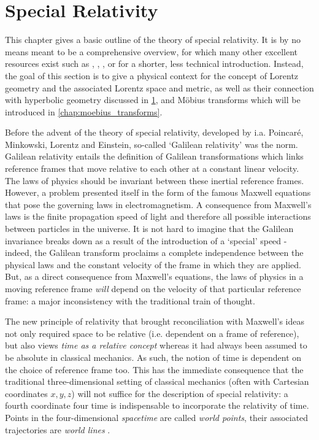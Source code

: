 \chapter{Special Relativity}
\label{chap:relativity}
This chapter gives a basic outline of the theory of special relativity. It is by no means meant to be a comprehensive overview, for which many other excellent resources exist such as \citet{Misner1970}, \citet{Taylor1992}, \citet{Landau1971}, or \citet{Penrose1978} for a shorter, less technical introduction. Instead, the goal of this section is to give a physical context for the concept of Lorentz geometry and the associated Lorentz space and metric, as well as their connection with hyperbolic geometry discussed in \cref{chap:relativity}, and Möbius transforms which will be introduced in \cref{chap:moebius_transforms}.

Before the advent of the theory of special relativity, developed by i.a. Poincaré, Minkowski, Lorentz and Einstein, so-called `Galilean relativity' was the norm. Galilean relativity entails the definition of Galilean transformations which links reference frames that move relative to each other at a constant linear velocity. The laws of physics should be invariant between these inertial reference frames. However, a problem presented itself in the form of the famous Maxwell equations that pose the governing laws in electromagnetism. A consequence from Maxwell's laws is the finite propagation speed of light and therefore all possible interactions between particles in the universe. It is not hard to imagine that the Galilean invariance breaks down as a result of the introduction of a `special' speed - indeed, the Galilean transform proclaims a complete independence between the physical laws and the constant velocity of the frame in which they are applied. But, as a direct consequence from Maxwell's equations, the laws of physics in a moving reference frame \emph{will} depend on the velocity of that particular reference frame: a major inconsistency with the traditional train of thought.

The new principle of relativity that brought reconciliation with Maxwell's ideas not only required space to be relative (i.e. dependent on a frame of reference), but also views \emph{time as a relative concept} whereas it had always been assumed to be absolute in classical mechanics. As such, the notion of time is dependent on the choice of reference frame too. This has the immediate consequence that the traditional three-dimensional setting of classical mechanics (often with Cartesian coordinates \(x, y, z\)) will not suffice for the description of special relativity: a fourth coordinate four time is indispensable to incorporate the relativity of time. Points in the four-dimensional \emph{spacetime} are called \emph{world points}, their associated trajectories are \emph{world lines} \cite{Landau1971}.

